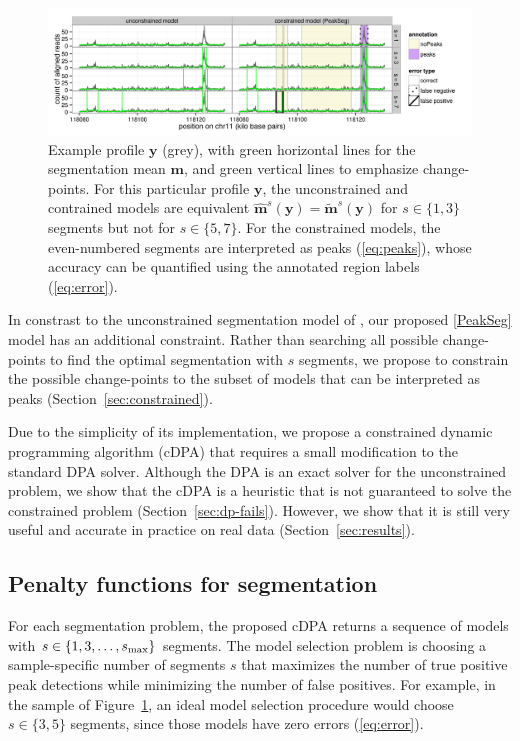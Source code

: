 \documentclass{article}
\begin{document}
\begin{figure}[b!]
  \centering
  \includegraphics[width=\textwidth]{figure-Segmentor-PeakSeg}
  \vskip -0.5cm
  \caption{Example profile $\mathbf y$ (grey), with green horizontal
    lines for the segmentation mean $\mathbf m$, and green vertical
    lines to emphasize change-points. For this particular profile
    $\mathbf y$, the unconstrained and contrained models are
    equivalent $\mathbf{\hat m}^s(\mathbf y) = \mathbf{\tilde
      m}^s(\mathbf y)$ for $s\in\{1, 3\}$ segments but not for
    $s\in\{5, 7\}$. For the constrained models, the even-numbered
    segments are interpreted as peaks (\ref{eq:peaks}), whose accuracy
    can be quantified using the annotated region labels (\ref{eq:error}).}
  \label{fig:Segmentor-PeakSeg}
\end{figure}

In constrast to the unconstrained segmentation model of
\citet{Segmentor}, our proposed \ref{PeakSeg} model has an additional
constraint. Rather than searching all possible change-points to find
the optimal segmentation with $s$ segments, we propose to constrain
the possible change-points to the subset of models that can be
interpreted as peaks (Section~\ref{sec:constrained}).

Due to the simplicity of its implementation, we propose a constrained
dynamic programming algorithm (cDPA) that requires a small
modification to the standard DPA solver. Although the DPA is an exact
solver for the unconstrained problem, we show that the cDPA is a
heuristic that is not guaranteed to solve the constrained
problem (Section~\ref{sec:dp-fails}). However, we show that it is
still very useful and accurate in practice on real data
(Section~\ref{sec:results}).

\subsection{Penalty functions for segmentation}

For each segmentation problem, the proposed cDPA returns a sequence of
models with $s\in\{1, 3, \dots, s_{\text{\text{max}}}\}$ segments. The model
selection problem is choosing a sample-specific number of segments $s$
that maximizes the number of true positive peak detections while
minimizing the number of false positives. For example, in the sample
of Figure~\ref{fig:Segmentor-PeakSeg}, an ideal model selection
procedure would choose $s\in\{3, 5\}$ segments, since those models
have zero errors (\ref{eq:error}).
\end{document}
